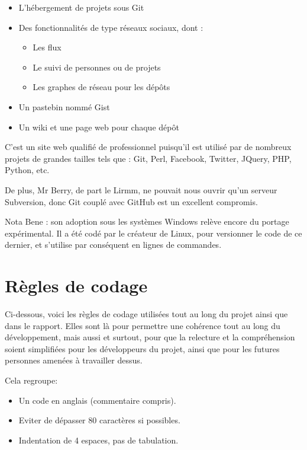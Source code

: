     \begin{itemize}
    \item L'hébergement de projets sous Git
    \item Des fonctionnalités de type réseaux sociaux, dont :
        \begin{itemize}
        \item Les flux
        \item Le suivi de personnes ou de projets
        \item Les graphes de réseau pour les dépôts
        \end{itemize}
    \item Un pastebin nommé Gist
    \item Un wiki et une page web pour chaque dépôt
    \end{itemize}

C'est un site web qualifié de professionnel puisqu'il est utilisé par de 
nombreux projets de grandes tailles tels que : Git, Perl, Facebook, Twitter,
JQuery, PHP, Python, etc.

De plus, Mr Berry, de part le Lirmm, ne pouvait nous ouvrir qu'un serveur
Subversion, donc Git couplé avec GitHub est un excellent compromis.

Nota Bene : son adoption sous les systèmes Windows relève encore du portage
expérimental. Il a été codé par le créateur de Linux, pour versionner le code
de ce dernier, et s'utilise par conséquent en lignes de commandes.

    \section{Règles de codage}

Ci-dessous, voici les règles de codage utilisées tout au long du projet
ainsi que dans le rapport. Elles sont là pour permettre une cohérence tout au
long du développement, mais aussi et surtout, pour que la relecture et la 
compréhension soient simplifiées pour les développeurs du projet, ainsi que pour les
futures personnes amenées à travailler dessus.

Cela regroupe:

    \begin{itemize}
    \item Un code en anglais (commentaire compris).
    \item Eviter de dépasser 80 caractères si possibles.
    \item Indentation de 4 espaces, pas de tabulation.
    \end{itemize}

